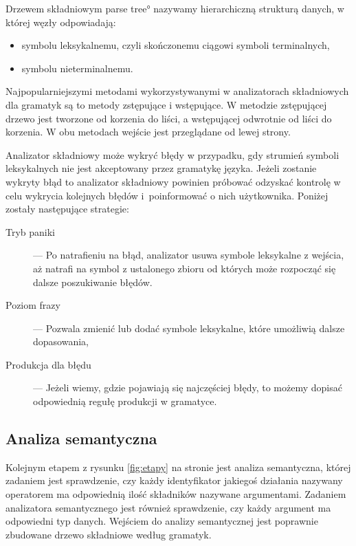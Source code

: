 Drzewem składniowym \ang{parse tree} nazywamy hierarchiczną strukturą danych,
 w której węzły odpowiadają:
\begin{itemize}
  \item  
    symbolu leksykalnemu, czyli skończonemu  ciągowi symboli terminalnych,
  \item  
    symbolu nieterminalnemu.
\end{itemize}


Najpopularniejszymi metodami wykorzystywanymi w analizatorach składniowych
 dla gramatyk są to metody zstępujące i wstępujące.
W metodzie zstępującej drzewo jest tworzone od korzenia do liści,
 a wstępującej odwrotnie od liści do korzenia.
W obu metodach wejście jest przeglądane od lewej strony.

Analizator składniowy może wykryć błędy w przypadku,
 gdy strumień symboli leksykalnych nie jest akceptowany przez gramatykę języka.
Jeżeli zostanie wykryty błąd to analizator składniowy powinien próbować odzyskać kontrolę w celu wykrycia kolejnych błędów
 i~poinformować o nich użytkownika.
Poniżej zostały następujące strategie\cite{aho}:
\begin{description}
  \item[Tryb paniki] --- 
     Po natrafieniu na błąd,
      analizator usuwa symbole leksykalne z wejścia, 
      aż natrafi na symbol z ustalonego zbioru od których może rozpocząć się dalsze poszukiwanie błędów.
  \item[Poziom frazy] --- 
     Pozwala zmienić lub dodać symbole leksykalne,
      które umożliwią dalsze dopasowania,
  \item [Produkcja dla błędu] --- 
     Jeżeli wiemy, 
      gdzie pojawiają się najczęściej błędy,
      to możemy dopisać odpowiednią regułę produkcji w gramatyce.
\end{description}

\subsection{Analiza semantyczna} \label{p_semantyczna}
Kolejnym etapem z rysunku \ref{fig:etapy} na stronie \pageref{fig:etapy} jest analiza semantyczna,
 której zadaniem jest sprawdzenie, 
 czy każdy identyfikator jakiegoś działania nazywany operatorem ma odpowiednią ilość składników nazywane argumentami.
Zadaniem analizatora semantycznego jest również sprawdzenie, czy każdy argument ma odpowiedni typ danych.
Wejściem do analizy semantycznej jest poprawnie zbudowane drzewo składniowe według gramatyk. \cite{aho}

